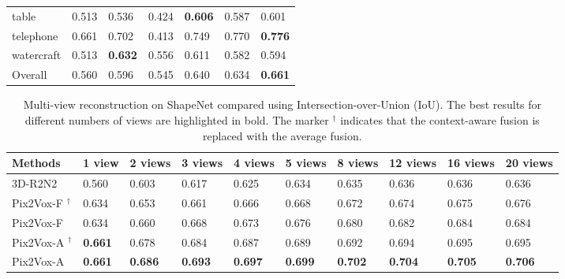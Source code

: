 \documentclass[10pt,twocolumn,letterpaper]{article}
\begin{document}
\begin{table*}[!t]
\begin{tabularx}{\linewidth}{XYYYYYY}
    table        & 0.513      & 0.536      & 0.424
                 & \bf{0.606} & 0.587      & 0.601 \\
    telephone    & 0.661      & 0.702      & 0.413
                 & 0.749      & 0.770      & \bf{0.776} \\
    watercraft   & 0.513      & \bf{0.632} & 0.556
                 & 0.611      & 0.582      & 0.594  \\
    \midrule
    Overall      & 0.560      & 0.596      & 0.545
                 & 0.640      & 0.634      & \bf{0.661} \\
    \bottomrule
  \end{tabularx}
  \label{tab:shapenet-reconstruction}
\end{table*}

\begin{table*}[!t]
  \caption{Multi-view reconstruction on ShapeNet compared using Intersection-over-Union (IoU). The best results for different numbers of views are highlighted in bold. The marker $^\dag$ indicates that the context-aware fusion is replaced with the average fusion.}
  \vspace{-2 mm}
  \centering
  \begin{tabularx}{\linewidth}{lYYYYYYYYY}
    \toprule
    Methods   & 1 view         & 2 views        & 3 views
              & 4 views        & 5 views        & 8 views
              & 12 views       & 16 views       & 20 views \\
    \midrule
    3D-R2N2   \cite{DBLP:conf/eccv/ChoyXGCS16}
              & 0.560          & 0.603          & 0.617
              & 0.625          & 0.634          & 0.635
              & 0.636          & 0.636          & 0.636 \\
    Pix2Vox-F \hspace{.6mm}$^\dag$ 
              & 0.634          & 0.653          & 0.661
              & 0.666          & 0.668          & 0.672
              & 0.674          & 0.675          & 0.676 \\
    Pix2Vox-F 
              & 0.634          & 0.660          & 0.668
              & 0.673          & 0.676          & 0.680
              & 0.682          & 0.684          & 0.684 \\
    Pix2Vox-A $^\dag$
              & \textbf{0.661} & 0.678          & 0.684
              & 0.687          & 0.689          & 0.692
              & 0.694          & 0.695          & 0.695 \\
    Pix2Vox-A & \textbf{0.661} & \textbf{0.686} & \textbf{0.693}
              & \textbf{0.697} & \textbf{0.699} & \textbf{0.702}
              & \textbf{0.704} & \textbf{0.705} & \textbf{0.706} \\
    \bottomrule
  \end{tabularx}
  \label{tab:shapenet-multi-view-reconstruction}
\end{table*}
\end{document}
